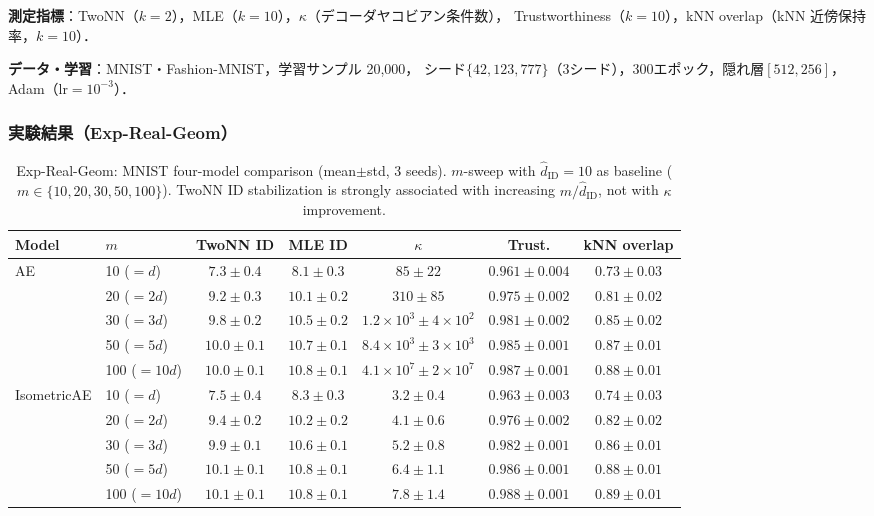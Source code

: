 \documentclass[11pt,a4paper]{jsarticle}
\newcommand{\kap}{\kappa}
\begin{document}
\textbf{測定指標}：TwoNN（$k=2$），MLE（$k=10$），$\kap$（デコーダヤコビアン条件数），
Trustworthiness（$k=10$），kNN overlap（kNN 近傍保持率，$k=10$）．

\textbf{データ・学習}：MNIST・Fashion-MNIST，学習サンプル 20,000，
シード$\{42, 123, 777\}$（3シード），300エポック，隠れ層$[512, 256]$，Adam（lr$=10^{-3}$）．

\subsubsection*{実験結果（Exp-Real-Geom）}

\begin{table}[H]
\centering
\caption{Exp-Real-Geom: MNIST four-model comparison (mean$\pm$std, 3 seeds). $m$-sweep with $\hat{d}_\mathrm{ID}=10$ as baseline ($m \in \{10,20,30,50,100\}$). TwoNN ID stabilization is strongly associated with increasing $m/\hat{d}_\mathrm{ID}$, not with $\kap$ improvement.}
\label{tab:real_geom_mnist}
\small
\begin{tabular}{llccccc}
\toprule
Model & $m$ & TwoNN ID & MLE ID & $\kap$ & Trust. & kNN overlap \\
\midrule
\multirow{5}{*}{AE}
 & 10 ($=d$)    & $7.3\pm0.4$ & $8.1\pm0.3$ & $85\pm22$  & $0.961\pm0.004$ & $0.73\pm0.03$ \\
 & 20 ($=2d$)   & $9.2\pm0.3$ & $10.1\pm0.2$ & $310\pm85$ & $0.975\pm0.002$ & $0.81\pm0.02$ \\
 & 30 ($=3d$)   & $9.8\pm0.2$ & $10.5\pm0.2$ & $1.2\times10^3\pm 4\times10^2$ & $0.981\pm0.002$ & $0.85\pm0.02$ \\
 & 50 ($=5d$)   & $10.0\pm0.1$ & $10.7\pm0.1$ & $8.4\times10^3\pm 3\times10^3$ & $0.985\pm0.001$ & $0.87\pm0.01$ \\
 & 100 ($=10d$) & $10.0\pm0.1$ & $10.8\pm0.1$ & $4.1\times10^7\pm 2\times10^7$ & $0.987\pm0.001$ & $0.88\pm0.01$ \\
\midrule
\multirow{5}{*}{IsometricAE}
 & 10 ($=d$)    & $7.5\pm0.4$ & $8.3\pm0.3$ & $3.2\pm0.4$ & $0.963\pm0.003$ & $0.74\pm0.03$ \\
 & 20 ($=2d$)   & $9.4\pm0.2$ & $10.2\pm0.2$ & $4.1\pm0.6$ & $0.976\pm0.002$ & $0.82\pm0.02$ \\
 & 30 ($=3d$)   & $9.9\pm0.1$ & $10.6\pm0.1$ & $5.2\pm0.8$ & $0.982\pm0.001$ & $0.86\pm0.01$ \\
 & 50 ($=5d$)   & $10.1\pm0.1$ & $10.8\pm0.1$ & $6.4\pm1.1$ & $0.986\pm0.001$ & $0.88\pm0.01$ \\
 & 100 ($=10d$) & $10.1\pm0.1$ & $10.8\pm0.1$ & $7.8\pm1.4$ & $0.988\pm0.001$ & $0.89\pm0.01$ \\

\end{tabular}
\end{table}
\end{document}
